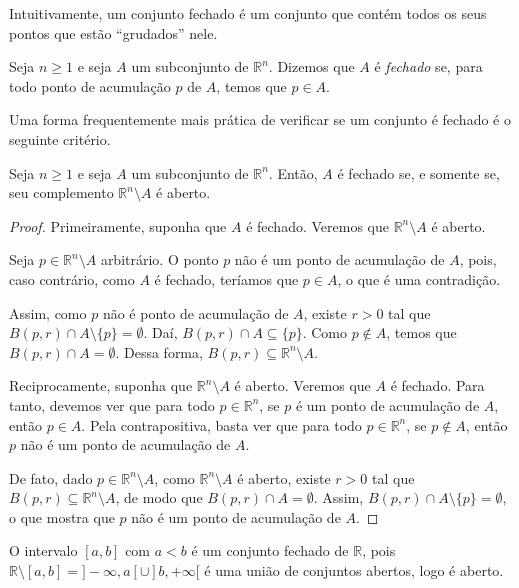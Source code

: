 Intuitivamente, um conjunto fechado é um conjunto que contém todos os seus pontos que estão ``grudados'' nele.

\begin{definition}
    Seja $n\geq 1$ e seja $A$ um subconjunto de $\mathbb R^n$.
    Dizemos que $A$ é \emph{fechado} se, para todo ponto de acumulação $p$ de $A$, temos que $p \in A$.
\end{definition}

Uma forma frequentemente mais prática de verificar se um conjunto é fechado é o seguinte critério.
\begin{proposition}
    Seja $n\geq 1$ e seja $A$ um subconjunto de $\mathbb R^n$.
    Então, $A$ é fechado se, e somente se, seu complemento $\mathbb R^n\setminus A$ é aberto.
\end{proposition}

\begin{proof}
    Primeiramente, suponha que $A$ é fechado.
    Veremos que $\mathbb R^n\setminus A$ é aberto.

    Seja $p \in \mathbb R^n\setminus A$ arbitrário.
    O ponto $p$ não é um ponto de acumulação de $A$, pois, caso contrário, como $A$ é fechado, teríamos que $p \in A$, o que é uma contradição.

    Assim, como $p$ não é ponto de acumulação de $A$, existe $r>0$ tal que $B(p, r)\cap A\setminus\{p\} = \emptyset$.
    Daí, $B(p, r)\cap A\subseteq \{p\}$.
    Como $p \notin A$, temos que $B(p, r)\cap A = \emptyset$.
    Dessa forma, $B(p, r)\subseteq \mathbb R^n\setminus A$.

    Reciprocamente, suponha que $\mathbb R^n\setminus A$ é aberto.
    Veremos que $A$ é fechado.
    Para tanto, devemos ver que para todo $p\in \mathbb R^n$, se $p$ é um ponto de acumulação de $A$, então $p \in A$.
    Pela contrapositiva, basta ver que para todo $p\in \mathbb R^n$, se $p \notin A$, então $p$ não é um ponto de acumulação de $A$.

    De fato, dado $p \in \mathbb R^n\setminus A$, como $\mathbb R^n\setminus A$ é aberto, existe $r>0$ tal que $B(p, r)\subseteq \mathbb R^n\setminus A$, de modo que $B(p, r)\cap A = \emptyset$.
    Assim, $B(p, r)\cap A\setminus\{p\} = \emptyset$, o que mostra que $p$ não é um ponto de acumulação de $A$.
\end{proof}

\begin{example}
    O intervalo $[a, b]$ com $a<b$ é um conjunto fechado de $\mathbb R$, pois $\mathbb R\setminus [a, b] = ]-\infty, a[ \cup ]b, +\infty[$ é uma união de conjuntos abertos, logo é aberto.
\end{example}

